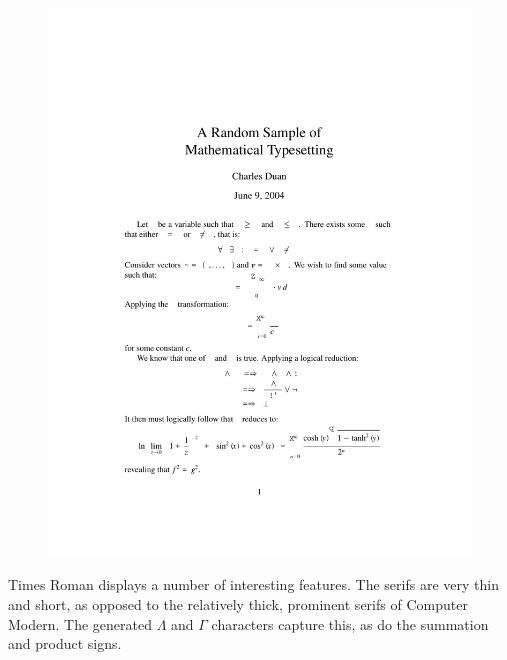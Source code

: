 \documentclass[preprint]{ltugproc}
\begin{document}
\begin{figure}
\centering
\includegraphics[trim=112.1475pt 1.5in 112.1475pt 2in]{times}
\end{figure}

Times Roman displays a number of interesting features. The serifs are very thin
and short, as opposed to the relatively thick, prominent serifs of Computer
Modern. The generated $\Lambda$ and $\Gamma$ characters capture this, as do the
summation and product signs.
\end{document}
